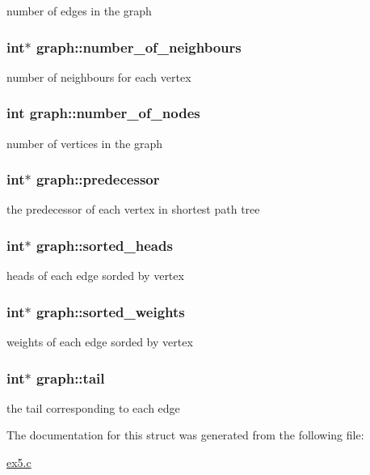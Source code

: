 number of edges in the graph \hypertarget{structgraph_a2e520373fd6490a3cecfeda1666da47a}{
\subsubsection[{number\+\_\+of\+\_\+neighbours}]{\setlength{\rightskip}{0pt plus 5cm}int$\ast$ graph\+::number\+\_\+of\+\_\+neighbours}}\label{structgraph_a2e520373fd6490a3cecfeda1666da47a}
number of neighbours for each vertex \hypertarget{structgraph_a5bebff53da4b1da5f65a2ada2fc4ba20}{
\subsubsection[{number\+\_\+of\+\_\+nodes}]{\setlength{\rightskip}{0pt plus 5cm}int graph\+::number\+\_\+of\+\_\+nodes}}\label{structgraph_a5bebff53da4b1da5f65a2ada2fc4ba20}
number of vertices in the graph \hypertarget{structgraph_ac355c19cbfaeeef1b41202949936cdcc}{
\subsubsection[{predecessor}]{\setlength{\rightskip}{0pt plus 5cm}int$\ast$ graph\+::predecessor}}\label{structgraph_ac355c19cbfaeeef1b41202949936cdcc}
the predecessor of each vertex in shortest path tree \hypertarget{structgraph_a785caa95ad9cf6efdb41eeef4db76f0c}{
\subsubsection[{sorted\+\_\+heads}]{\setlength{\rightskip}{0pt plus 5cm}int$\ast$ graph\+::sorted\+\_\+heads}}\label{structgraph_a785caa95ad9cf6efdb41eeef4db76f0c}
heads of each edge sorded by vertex \hypertarget{structgraph_a0af7e336ca28cb1c4b6461892db93ab7}{
\subsubsection[{sorted\+\_\+weights}]{\setlength{\rightskip}{0pt plus 5cm}int$\ast$ graph\+::sorted\+\_\+weights}}\label{structgraph_a0af7e336ca28cb1c4b6461892db93ab7}
weights of each edge sorded by vertex \hypertarget{structgraph_a7c6e091e35ae88d32cb507752324056d}{
\subsubsection[{tail}]{\setlength{\rightskip}{0pt plus 5cm}int$\ast$ graph\+::tail}}\label{structgraph_a7c6e091e35ae88d32cb507752324056d}
the tail corresponding to each edge 

The documentation for this struct was generated from the following file\+:\begin{DoxyCompactItemize}
\item 
\hyperlink{ex5_8c}{ex5.\+c}\end{DoxyCompactItemize}
